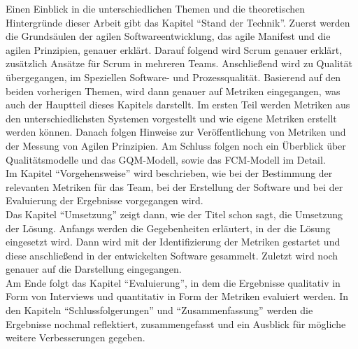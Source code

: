 Einen Einblick in die unterschiedlichen Themen und die theoretischen Hintergründe dieser Arbeit gibt das Kapitel ``Stand der Technik''.
Zuerst werden die Grundsäulen der agilen Softwareentwicklung, das agile Manifest und die agilen Prinzipien, genauer erklärt.
Darauf folgend wird Scrum genauer erklärt, zusätzlich Ansätze für Scrum in mehreren Teams.
Anschließend wird zu Qualität übergegangen, im Speziellen Software- und Prozessqualität.
Basierend auf den beiden vorherigen Themen, wird dann genauer auf Metriken eingegangen, was auch der Hauptteil dieses Kapitels darstellt.
Im ersten Teil werden Metriken aus den unterschiedlichsten Systemen vorgestellt und wie eigene Metriken erstellt werden können.
Danach folgen Hinweise zur Veröffentlichung von Metriken und der Messung von Agilen Prinzipien.
Am Schluss folgen noch ein Überblick über Qualitätsmodelle und das \ac{GQM}-Modell, sowie das \ac{FCM}-Modell im Detail.
\\
Im Kapitel ``Vorgehensweise'' wird beschrieben, wie bei der Bestimmung der relevanten Metriken für das Team, bei der Erstellung der Software und bei der Evaluierung der Ergebnisse vorgegangen wird.
\\
Das Kapitel ``Umsetzung'' zeigt dann, wie der Titel schon sagt, die Umsetzung der Lösung.
Anfangs werden die Gegebenheiten erläutert, in der die Lösung eingesetzt wird.
Dann wird mit der Identifizierung der Metriken gestartet und diese anschließend in der entwickelten Software gesammelt.
Zuletzt wird noch genauer auf die Darstellung eingegangen.
\\
Am Ende folgt das Kapitel ``Evaluierung'', in dem die Ergebnisse qualitativ in Form von Interviews und quantitativ in Form der Metriken evaluiert werden.
In den Kapiteln ``Schlussfolgerungen'' und ``Zusammenfassung'' werden die Ergebnisse nochmal reflektiert, zusammengefasst und ein Ausblick für mögliche weitere Verbesserungen gegeben.
